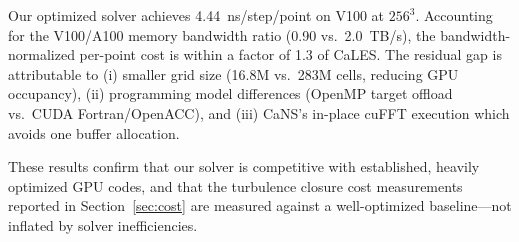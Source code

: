 Our optimized solver achieves 4.44~ns/step/point on V100 at $256^3$.
Accounting for the V100/A100 memory bandwidth ratio (0.90 vs.\ 2.0~TB/s), the bandwidth-normalized per-point cost is within a factor of 1.3 of CaLES.
The residual gap is attributable to (i) smaller grid size (16.8M vs.\ 283M cells, reducing GPU occupancy), (ii) programming model differences (OpenMP target offload vs.\ CUDA Fortran/OpenACC), and (iii) CaNS's in-place cuFFT execution which avoids one buffer allocation.

These results confirm that our solver is competitive with established, heavily optimized GPU codes, and that the turbulence closure cost measurements reported in Section~\ref{sec:cost} are measured against a well-optimized baseline---not inflated by solver inefficiencies.
